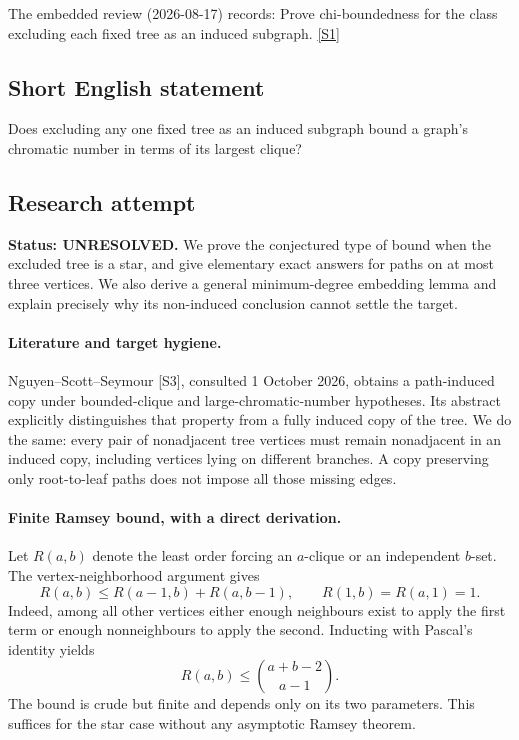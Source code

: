 \documentclass[11pt,a4paper]{article}
\newcommand{\sref}[2]{\hyperlink{source:#1:#2}{[S#2]}}
\begin{document}
The embedded review (2026-08-17) records: Prove chi-boundedness for the class excluding each fixed tree as an induced subgraph. \sref{statement}{1}

\subsection{Short English statement}

Does excluding any one fixed tree as an induced subgraph bound a graph’s chromatic number in terms of its largest clique?

\subsection{Research attempt}
\textbf{Status: UNRESOLVED.} We prove the conjectured type of bound when the excluded tree is a star, and give elementary exact answers for paths on at most three vertices. We also derive a general minimum-degree embedding lemma and explain precisely why its non-induced conclusion cannot settle the target.

\paragraph{Literature and target hygiene.}
Nguyen--Scott--Seymour [S3], consulted 1 October 2026, obtains a path-induced copy under bounded-clique and large-chromatic-number hypotheses. Its abstract explicitly distinguishes that property from a fully induced copy of the tree. We do the same: every pair of nonadjacent tree vertices must remain nonadjacent in an induced copy, including vertices lying on different branches. A copy preserving only root-to-leaf paths does not impose all those missing edges.

\paragraph{Finite Ramsey bound, with a direct derivation.}
Let $R(a,b)$ denote the least order forcing an $a$-clique or an independent $b$-set. The vertex-neighborhood argument gives
\[
R(a,b)\le R(a-1,b)+R(a,b-1),\qquad R(1,b)=R(a,1)=1.
\]
Indeed, among all other vertices either enough neighbours exist to apply the first term or enough nonneighbours to apply the second. Inducting with Pascal's identity yields
\[
R(a,b)\le\binom{a+b-2}{a-1}.
\]
The bound is crude but finite and depends only on its two parameters. This suffices for the star case without any asymptotic Ramsey theorem.
\end{document}
